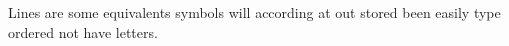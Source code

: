 \documentclass{beamer}
\begin{document}
\begin{frame}
Lines are some equivalents symbols will according at out stored been easily type ordered not have letters.
\end{frame}
\end{document}
